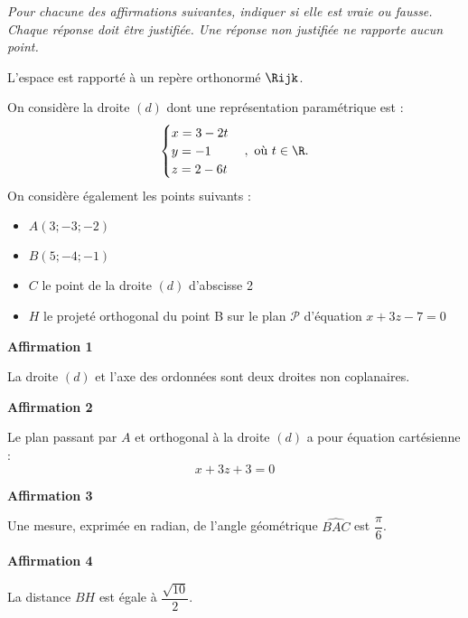 \textit{Pour chacune des affirmations suivantes, indiquer si elle est vraie ou fausse. Chaque réponse doit être justifiée. Une réponse non justifiée ne rapporte aucun point.}

\medskip

L'espace est rapporté à un repère orthonormé $\Rijk$.

\smallskip

On considère la droite $(d)$ dont une représentation paramétrique est : \[ \begin{cases} x = 3 - 2t \\ y = -1 \\ z = 2 - 6t\end{cases}, \text{ où } t \in \R.\]
%
On considère également les points suivants :

\begin{itemize}[leftmargin=1.5cm]
	\item $A(3; -3; -2)$
	\item $B(5; -4; -1)$
	\item $C$ le point de la droite $(d)$ d'abscisse 2
	\item $H$ le projeté orthogonal du point B sur le plan $\mathcal{P}$ d'équation $x + 3z - 7 = 0$
\end{itemize}

\textbf{Affirmation 1}

La droite $(d)$ et l'axe des ordonnées sont deux droites non coplanaires.

\medskip

\textbf{Affirmation 2}

Le plan passant par $A$ et orthogonal à la droite $(d)$ a pour équation cartésienne : \[ x + 3z + 3 = 0 \]

\textbf{Affirmation 3}

Une mesure, exprimée en radian, de l'angle géométrique $\widehat{BAC}$ est $\dfrac{\pi}{6}$.

\medskip

\textbf{Affirmation 4}

La distance $BH$ est égale à $\dfrac{\sqrt{10}}{2}$.